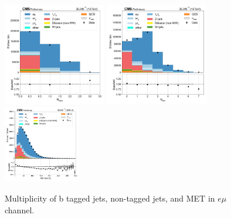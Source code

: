 \begin{figure}[htb!]
    \centering
    \includegraphics[width=0.4\textwidth]{chapters/Appendix/sectionPlots/figures/data_mc_overlays/emu_2016_inclusive_linear_jet_n_bjets}
    \includegraphics[width=0.4\textwidth]{chapters/Appendix/sectionPlots/figures/data_mc_overlays/emu_2016_inclusive_linear_jet_n_jets}
    \includegraphics[width=0.3\textwidth]{chapters/Appendix/sectionPlots/figures/data_mc_overlays/emu_2016_inclusive_linear_misc_met_mag}
    \caption{Multiplicity of b tagged jets, non-tagged jets, and MET in
    $e\mu$ channel.}
    \label{fig:emu_jetmet}
\end{figure}

